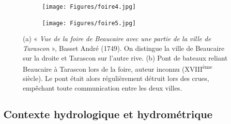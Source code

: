 \documentclass[11pt]{article}
\begin{document}
\begin{figure}[h]
		\centering
            \begin{subfigure}{0.49\linewidth}
            \centering
            	\texttt{[image: Figures/foire4.jpg]}\hfill
            	\caption{}
            	\label{subfig:foire1}
            \end{subfigure}
            \begin{subfigure}{0.49\linewidth}
            \centering
            	\texttt{[image: Figures/foire5.jpg]}
            	\caption{}
           		\label{subfig:foire2}
            \end{subfigure}
\caption{(a) « \textit{Vue de la foire de Beaucaire avec une partie de la ville de Tarascon} », Basset André (1749). On distingue la ville de Beaucaire sur la droite et Tarascon sur l'autre rive. 
(b) Pont de bateaux reliant Beaucaire à Tarascon lors de la foire, auteur inconnu (XVIII\textsuperscript{ème} siècle). Le pont était alors régulièrement détruit lors des crues, empêchant toute communication entre les deux villes.}
\label{fig:foire}
\end{figure}

	\subsection{Contexte hydrologique et hydrométrique}
	
\end{document}
